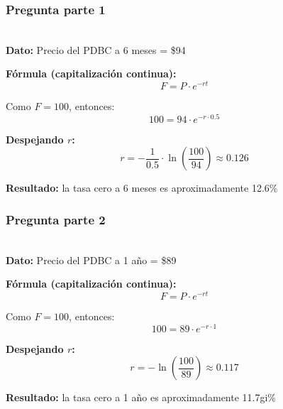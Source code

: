 \documentclass{beamer}
\begin{document}
\begin{frame}
      \frametitle{Pregunta  parte 1}
      \LARGE {} \\[1em]
  
      \footnotesize
      \textbf{Dato:} Precio del PDBC a 6 meses = \$94
  
      \pause
  
      \textbf{Fórmula (capitalización continua):}
      \[
      F = P \cdot e^{-rt}
      \]
  
      \pause
  
      Como $F = 100$, entonces:
      \[
      100 = 94 \cdot e^{-r \cdot 0.5}
      \]
  
      \pause
  
      \textbf{Despejando $r$:}
      \[
      r = -\frac{1}{0.5} \cdot \ln\left(\frac{100}{94}\right) \approx 0.126
      \]
  
      \pause
  
      \textbf{Resultado:} la tasa cero a 6 meses es aproximadamente 12.6\%
\end{frame}
\begin{frame}
      \frametitle{Pregunta  parte 2}
      \LARGE {} \\[1em]
  
      \footnotesize
      \textbf{Dato:} Precio del PDBC a 1 año = \$89
  
      \pause
  
      \textbf{Fórmula (capitalización continua):}
      \[
      F = P \cdot e^{-rt}
      \]
  
      \pause
  
      Como $F = 100$, entonces:
      \[
      100 = 89 \cdot e^{-r \cdot 1}
      \]
  
      \pause
  
      \textbf{Despejando $r$:}
      \[
      r = -\ln\left(\frac{100}{89}\right) \approx 0.117
      \]
  
      \pause
  
      \textbf{Resultado:} la tasa cero a 1 año es aproximadamente 11.7gi\%
\end{frame}
\end{document}
